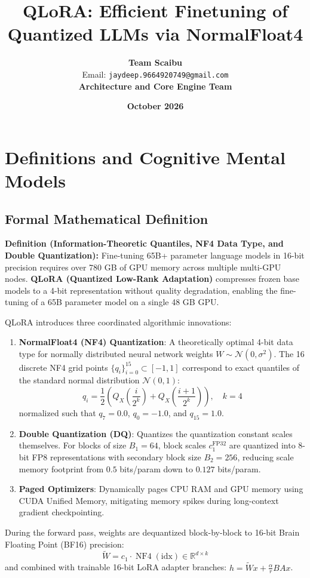 \documentclass[11pt,a4paper]{article}
\title{\textbf{QLoRA: Efficient Finetuning of Quantized LLMs via NormalFloat4}}
\author{\textbf{Team Scaibu} \\ \small Email: \texttt{jaydeep.9664920749@gmail.com} \\ \small \textbf{Architecture and Core Engine Team}}
\date{\textbf{October 2026}}
\theoremstyle{definition}
\begin{document}
\maketitle

\section{Definitions and Cognitive Mental Models}

\subsection{Formal Mathematical Definition}
\textbf{Definition (Information-Theoretic Quantiles, NF4 Data Type, and Double Quantization):}
Fine-tuning 65B+ parameter language models in 16-bit precision requires over 780 GB of GPU memory across multiple multi-GPU nodes. \textbf{QLoRA (Quantized Low-Rank Adaptation)} compresses frozen base models to a 4-bit representation without quality degradation, enabling the fine-tuning of a 65B parameter model on a single 48 GB GPU.

QLoRA introduces three coordinated algorithmic innovations:
\begin{enumerate}
    \item \textbf{NormalFloat4 (NF4) Quantization}: A theoretically optimal 4-bit data type for normally distributed neural network weights $W \sim \mathcal{N}(0, \sigma^2)$. The 16 discrete NF4 grid points $\{q_i\}_{i=0}^{15} \subset [-1, 1]$ correspond to exact quantiles of the standard normal distribution $\mathcal{N}(0, 1)$:
    {\boldmath
    \begin{equation}
    q_i = \frac{1}{2}\left( Q_X\left(\frac{i}{2^k}\right) + Q_X\left(\frac{i+1}{2^k}\right) \right), \quad k = 4
    \end{equation}
    }
    normalized such that $q_7 = 0.0$, $q_0 = -1.0$, and $q_{15} = 1.0$.
    \item \textbf{Double Quantization (DQ)}: Quantizes the quantization constant scales themselves. For blocks of size $B_1 = 64$, block scales $c_1^{\text{FP32}}$ are quantized into 8-bit FP8 representations with secondary block size $B_2 = 256$, reducing scale memory footprint from $0.5$ bits/param down to $0.127$ bits/param.
    \item \textbf{Paged Optimizers}: Dynamically pages CPU RAM and GPU memory using CUDA Unified Memory, mitigating memory spikes during long-context gradient checkpointing.
\end{enumerate}
During the forward pass, weights are dequantized block-by-block to 16-bit Brain Floating Point (BF16) precision:
{\boldmath
\begin{equation}
\tilde{W} = c_1 \cdot \operatorname{NF4}(\text{idx}) \in \mathbb{R}^{d \times k}
\end{equation}
}
and combined with trainable 16-bit LoRA adapter branches: $h = \tilde{W}x + \frac{\alpha}{r}BAx$.
\end{document}
